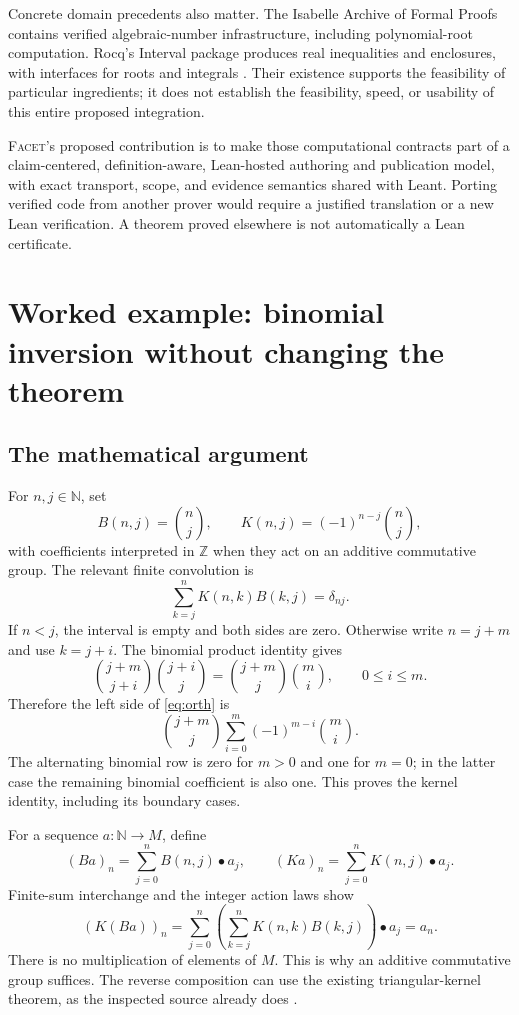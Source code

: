 \documentclass[11pt,letterpaper]{article}
\newcommand{\Facet}{\textsc{Facet}}
\newcommand{\N}{\mathbb N}
\newcommand{\Z}{\mathbb Z}
\numberwithin{equation}{section}
\begin{document}
Concrete domain precedents also matter. The Isabelle Archive of Formal Proofs
contains verified algebraic-number infrastructure, including polynomial-root
computation. Rocq's Interval package produces real inequalities and enclosures,
with interfaces for roots and integrals \cite{afp,interval}. Their existence
supports the feasibility of particular ingredients; it does not establish the
feasibility, speed, or usability of this entire proposed integration.

\Facet{}'s proposed contribution is to make those computational contracts part
of a claim-centered, definition-aware, Lean-hosted authoring and publication
model, with exact transport, scope, and evidence semantics shared with Leant.
Porting verified code from another prover would require a justified translation
or a new Lean verification. A theorem proved elsewhere is not automatically a
Lean certificate.

\section{Worked example: binomial inversion without changing the theorem}\label{sec:binomial}
\subsection{The mathematical argument}
For $n,j\in\N$, set
\[
 B(n,j)=\binom nj,\qquad K(n,j)=(-1)^{n-j}\binom nj,
\]
with coefficients interpreted in $\Z$ when they act on an additive commutative
group. The relevant finite convolution is
\begin{equation}
 \sum_{k=j}^{n}K(n,k)B(k,j)=\delta_{nj}.                 \label{eq:orth}
\end{equation}
If $n<j$, the interval is empty and both sides are zero. Otherwise write
$n=j+m$ and use $k=j+i$. The binomial product identity gives
\[
 \binom{j+m}{j+i}\binom{j+i}{j}=\binom{j+m}{j}\binom mi,
 \qquad 0\le i\le m.
\]
Therefore the left side of \eqref{eq:orth} is
\[
 \binom{j+m}{j}\sum_{i=0}^{m}(-1)^{m-i}\binom mi.
\]
The alternating binomial row is zero for $m>0$ and one for $m=0$; in the latter
case the remaining binomial coefficient is also one. This proves the kernel
identity, including its boundary cases.

For a sequence $a:\N\to M$, define
\[
 (Ba)_n=\sum_{j=0}^{n}B(n,j)\mathbin{\bullet}a_j,
 \qquad (Ka)_n=\sum_{j=0}^{n}K(n,j)\mathbin{\bullet}a_j.
\]
Finite-sum interchange and the integer action laws show
\[
 (K(Ba))_n
 =\sum_{j=0}^{n}\left(\sum_{k=j}^{n}K(n,k)B(k,j)\right)
     \mathbin{\bullet}a_j=a_n.
\]
There is no multiplication of elements of $M$. This is why an additive
commutative group suffices. The reverse composition can use the existing
triangular-kernel theorem, as the inspected source already does
\cite{p-binomial}.
\end{document}
